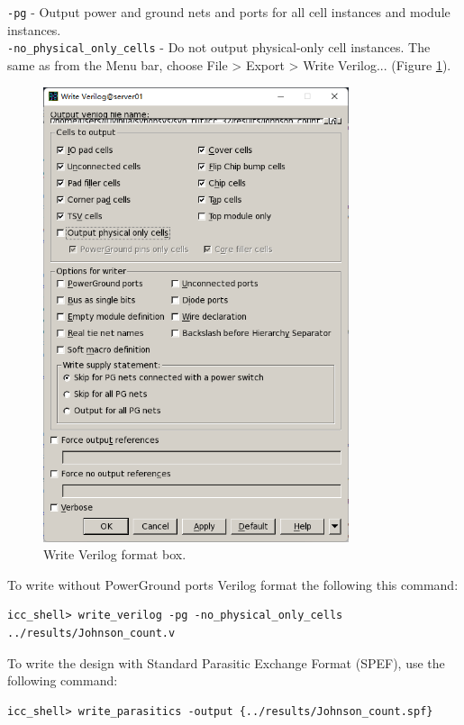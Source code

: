 \documentclass[a4paper,12pt,twoside]{article}
\begin{document}
\begin{enumerate}
    \texttt{-pg} - Output power and ground nets and ports for all cell instances and module instances.\\
    \texttt{-no\_physical\_only\_cells} - Do not output physical-only cell instances. The same as from the Menu bar,  choose File > Export > Write Verilog... (Figure \ref{f28}).
    \begin{figure}[H]
        \centering
        \includegraphics[width=0.8\textwidth]{images/28.png}
        \caption{Write Verilog format box.}
        \label{f28}
    \end{figure}
    To write without PowerGround ports Verilog format the following this command:
    \begin{verbatim}
icc_shell> write_verilog -pg -no_physical_only_cells ../results/Johnson_count.v
    \end{verbatim}
    To write the design with Standard Parasitic Exchange Format (SPEF), use the following command:
    \begin{verbatim}
icc_shell> write_parasitics -output {../results/Johnson_count.spf}
    \end{verbatim}

\end{enumerate}
\end{document}
